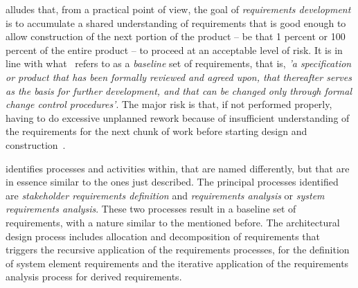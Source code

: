 \documentclass[dissertation,final]{softeng}
\begin{document}
\citet{Wiegers2013} alludes that, from a practical point of view, the goal of \emph{requirements development} is to accumulate a shared understanding of requirements that is good enough to allow construction of the next portion of the product -- be that 1 percent or 100 percent of the entire product -- to proceed at an acceptable level of risk. It is in line with what~ refers to as a \emph{baseline} set of requirements, that is, \emph{'a specification or product that has been formally reviewed and agreed upon, that thereafter serves as the basis for further development, and that can be changed only through formal change control procedures'}. The major risk is that, if not performed properly, having to do excessive unplanned rework because of insufficient understanding of the requirements for the next chunk of work before starting design and construction~\citep{Wiegers2013}.

 identifies processes and activities within, that are named differently, but that are in essence similar to the ones just described. The principal processes identified are \emph{stakeholder requirements definition} and \emph{requirements analysis} or \emph{system requirements analysis}. These two processes result in a baseline set of requirements, with a nature similar to the mentioned before. The architectural design process includes allocation and decomposition of requirements that triggers the recursive application of the requirements processes, for the definition of system element requirements and the iterative application of the requirements analysis process for derived requirements.
\end{document}
